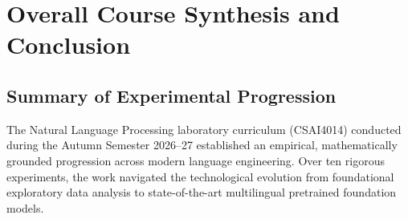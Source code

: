 \chapter{Overall Course Synthesis and Conclusion}

\section{Summary of Experimental Progression}
The Natural Language Processing laboratory curriculum (CSAI4014) conducted during the Autumn Semester 2026--27 established an empirical, mathematically grounded progression across modern language engineering. Over ten rigorous experiments, the work navigated the technological evolution from foundational exploratory data analysis to state-of-the-art multilingual pretrained foundation models.

